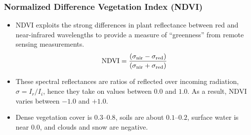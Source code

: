 \begin{frame}
 \frametitle{Normalized Difference Vegetation Index (NDVI)}
 \begin{itemize}
  \item NDVI exploits the strong differences in plant reflectance between red and near-infrared wavelengths to provide a measure of {\color{DarkGreen}``greenness''} from remote sensing measurements. 
  \begin{equation}
   \textnormal{NDVI} = \frac{\left(\sigma_\textnormal{nir} - \sigma_\textnormal{red}\right)}{\left(\sigma_\textnormal{nir} + \sigma_\textnormal{red}\right)}
  \end{equation}
  \item These spectral reflectances are ratios of reflected over incoming radiation, $\sigma = {I_r} / {I_i}$, hence they take on values between $0.0$ and $1.0$.  As a result, NDVI varies between $-1.0$ and $+1.0$.
  \item Dense vegetation cover is $0.3$--$0.8$, soils are about $0.1$--$0.2$, surface water is near $0.0$, and clouds and snow are negative.
 \end{itemize}
\end{frame}

